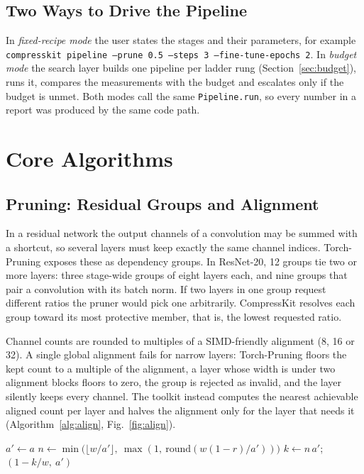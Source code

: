 \documentclass[oneside,a4paper,12pt]{report}
\newcommand{\code}[1]{\texttt{\small #1}}
\begin{document}
\subsection{Two Ways to Drive the Pipeline}
In \emph{fixed-recipe mode} the user states the stages and their parameters, for example \code{compresskit pipeline --prune 0.5 --steps 3 --fine-tune-epochs 2}. In \emph{budget mode} the search layer builds one pipeline per ladder rung (Section~\ref{sec:budget}), runs it, compares the measurements with the budget and escalates only if the budget is unmet. Both modes call the same \code{Pipeline.run}, so every number in a report was produced by the same code path.

\section{Core Algorithms}
\subsection{Pruning: Residual Groups and Alignment}
In a residual network the output channels of a convolution may be summed with a shortcut, so several layers must keep exactly the same channel indices. Torch-Pruning exposes these as dependency groups. In ResNet-20, 12 groups tie two or more layers: three stage-wide groups of eight layers each, and nine groups that pair a convolution with its batch norm. If two layers in one group request different ratios the pruner would pick one arbitrarily. CompressKit resolves each group toward its most protective member, that is, the lowest requested ratio.


Channel counts are rounded to multiples of a SIMD-friendly alignment (8, 16 or 32). A single global alignment fails for narrow layers: Torch-Pruning floors the kept count to a multiple of the alignment, a layer whose width is under two alignment blocks floors to zero, the group is rejected as invalid, and the layer silently keeps every channel. The toolkit instead computes the nearest achievable aligned count per layer and halves the alignment only for the layer that needs it (Algorithm~\ref{alg:align}, Fig.~\ref{fig:align}).

\begin{algorithm}[H]
\caption{Per-layer aligned ratio (from \code{\_aligned\_ratio})}\label{alg:align}
$a' \gets a$\;
$n \gets \min\big(\lfloor w/a' \rfloor,\ \max(1,\ \mathrm{round}(w(1-r)/a'))\big)$\;
$k \gets n\,a'$; \Return $(1-k/w,\ a')$\;
\end{algorithm}
\end{document}
